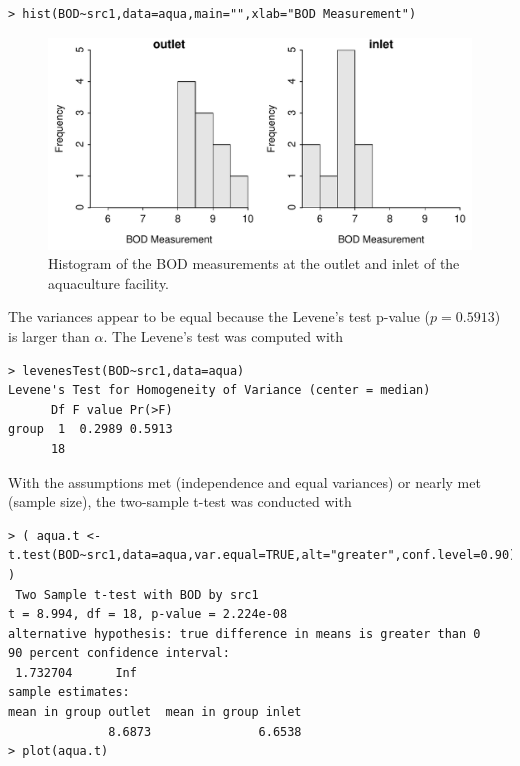 \documentclass[10pt,openany]{book}\usepackage[]{graphicx}\usepackage[]{color}
\makeatletter
\newenvironment{kframe}{%
 \def\at@end@of@kframe{}%
 \ifinner\ifhmode%
  \def\at@end@of@kframe{\end{minipage}}%
  \begin{minipage}{\columnwidth}%
 \fi\fi%
 \def\FrameCommand##1{\hskip\@totalleftmargin \hskip-\fboxsep
 \colorbox{shadecolor}{##1}\hskip-\fboxsep
     \hskip-\linewidth \hskip-\@totalleftmargin \hskip\columnwidth}%
 \MakeFramed {\advance\hsize-\width
   \@totalleftmargin\z@ \linewidth\hsize
   \@setminipage}}%
 {\par\unskip\endMakeFramed%
 \at@end@of@kframe}
\newenvironment{knitrout}{}{} %
\makeatother
\begin{document}
\begin{enumerate}
\begin{knitrout}
\color{fgcolor}\begin{kframe}
\begin{verbatim}
> hist(BOD~src1,data=aqua,main="",xlab="BOD Measurement")
\end{verbatim}
\end{kframe}\begin{figure}[hbtp]

{\centering \includegraphics[width=.8\linewidth]{Figs/AquaHist-1} 

}

\caption[Histogram of the BOD measurements at the outlet and inlet of the aquaculture facility]{Histogram of the BOD measurements at the outlet and inlet of the aquaculture facility.}\label{fig:AquaHist}
\end{figure}


\end{knitrout}

The variances appear to be equal because the Levene's test p-value ($p=0.5913$) is larger than $\alpha$.  The Levene's test was computed with
\begin{knitrout}
\color{fgcolor}\begin{kframe}
\begin{verbatim}
> levenesTest(BOD~src1,data=aqua)
Levene's Test for Homogeneity of Variance (center = median)
      Df F value Pr(>F)
group  1  0.2989 0.5913
      18               
\end{verbatim}
\end{kframe}
\end{knitrout}

With the assumptions met (independence and equal variances) or nearly met (sample size), the two-sample t-test was conducted with
\begin{knitrout}
\color{fgcolor}\begin{kframe}
\begin{verbatim}
> ( aqua.t <- t.test(BOD~src1,data=aqua,var.equal=TRUE,alt="greater",conf.level=0.90) )
 Two Sample t-test with BOD by src1 
t = 8.994, df = 18, p-value = 2.224e-08
alternative hypothesis: true difference in means is greater than 0 
90 percent confidence interval:
 1.732704      Inf 
sample estimates:
mean in group outlet  mean in group inlet 
              8.6873               6.6538 
> plot(aqua.t)
\end{verbatim}
\end{kframe}\begin{figure}[hbtp]


\end{figure}
\end{knitrout}
\end{enumerate}
\end{document}

